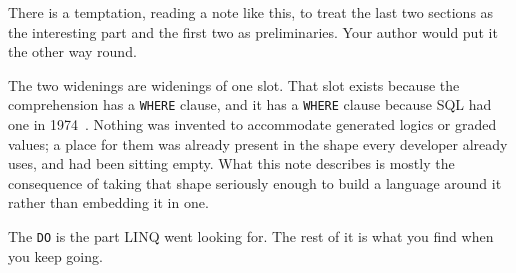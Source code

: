 There is a temptation, reading a note like this, to treat the last two sections
as the interesting part and the first two as preliminaries. Your author would
put it the other way round.

The two widenings are widenings of one slot. That slot exists because the
comprehension has a \texttt{WHERE} clause, and it has a \texttt{WHERE} clause
because SQL had one in 1974~\cite{ChamberlinBoyce74}. Nothing was invented to accommodate generated
logics or graded values; a place for them was already present in the shape every
developer already uses, and had been sitting empty. What this note describes is
mostly the consequence of taking that shape seriously enough to build a language
around it rather than embedding it in one.

The \texttt{DO} is the part LINQ went looking for. The rest of it is what you
find when you keep going.
